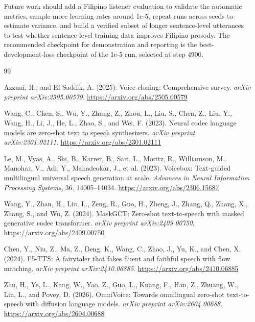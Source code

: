 \documentclass[11pt]{article}
\begin{document}
Future work should add a Filipino listener evaluation to validate the automatic metrics, sample more learning rates around 1e-5, repeat runs across seeds to estimate variance, and build a verified subset of longer sentence-level utterances to test whether sentence-level training data improves Filipino prosody. The recommended checkpoint for demonstration and reporting is the best-development-loss checkpoint of the 1e-5 run, selected at step 4900.

\begin{thebibliography}{99}

Azzuni, H., and El Saddik, A. (2025). Voice cloning: Comprehensive survey. \textit{arXiv preprint arXiv:2505.00579}. \url{https://arxiv.org/abs/2505.00579}

Wang, C., Chen, S., Wu, Y., Zhang, Z., Zhou, L., Liu, S., Chen, Z., Liu, Y., Wang, H., Li, J., He, L., Zhao, S., and Wei, F. (2023). Neural codec language models are zero-shot text to speech synthesizers. \textit{arXiv preprint arXiv:2301.02111}. \url{https://arxiv.org/abs/2301.02111}

Le, M., Vyas, A., Shi, B., Karrer, B., Sari, L., Moritz, R., Williamson, M., Manohar, V., Adi, Y., Mahadeokar, J., et al. (2023). Voicebox: Text-guided multilingual universal speech generation at scale. \textit{Advances in Neural Information Processing Systems}, 36, 14005--14034. \url{https://arxiv.org/abs/2306.15687}

Wang, Y., Zhan, H., Liu, L., Zeng, R., Guo, H., Zheng, J., Zhang, Q., Zhang, X., Zhang, S., and Wu, Z. (2024). MaskGCT: Zero-shot text-to-speech with masked generative codec transformer. \textit{arXiv preprint arXiv:2409.00750}. \url{https://arxiv.org/abs/2409.00750}

Chen, Y., Niu, Z., Ma, Z., Deng, K., Wang, C., Zhao, J., Yu, K., and Chen, X. (2024). F5-TTS: A fairytaler that fakes fluent and faithful speech with flow matching. \textit{arXiv preprint arXiv:2410.06885}. \url{https://arxiv.org/abs/2410.06885}

Zhu, H., Ye, L., Kang, W., Yao, Z., Guo, L., Kuang, F., Han, Z., Zhuang, W., Lin, L., and Povey, D. (2026). OmniVoice: Towards omnilingual zero-shot text-to-speech with diffusion language models. \textit{arXiv preprint arXiv:2604.00688}. \url{https://arxiv.org/abs/2604.00688}


\end{thebibliography}
\end{document}
